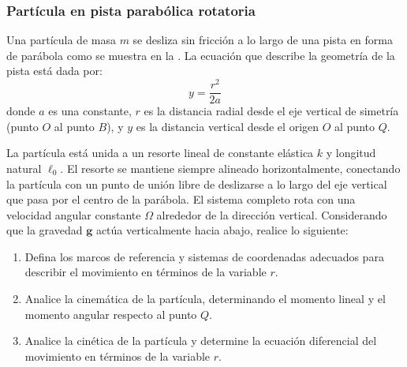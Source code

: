 \subsubsection{Partícula en pista parabólica rotatoria}

Una partícula de masa $m$ se desliza sin fricción a lo largo de una pista en forma de parábola como se muestra en la . La ecuación que describe la geometría de la pista está dada por:
\[ y = \frac{r^2}{2a} \]
donde $a$ es una constante, $r$ es la distancia radial desde el eje vertical de simetría (punto $O$ al punto $B$), y $y$ es la distancia vertical desde el origen $O$ al punto $Q$. 

La partícula está unida a un resorte lineal de constante elástica $k$ y longitud natural $\ell_0$. El resorte se mantiene siempre alineado horizontalmente, conectando la partícula con un punto de unión libre de deslizarse a lo largo del eje vertical que pasa por el centro de la parábola. El sistema completo rota con una velocidad angular constante $\Omega$ alrededor de la dirección vertical. Considerando que la gravedad $\mathbf{g}$ actúa verticalmente hacia abajo, realice lo siguiente:

\begin{enumerate}
    \item Defina los marcos de referencia y sistemas de coordenadas adecuados para describir el movimiento en términos de la variable $r$.
    \item Analice la cinemática de la partícula, determinando el momento lineal y el momento angular respecto al punto $Q$.
    \item Analice la cinética de la partícula y determine la ecuación diferencial del movimiento en términos de la variable $r$.
\end{enumerate}

